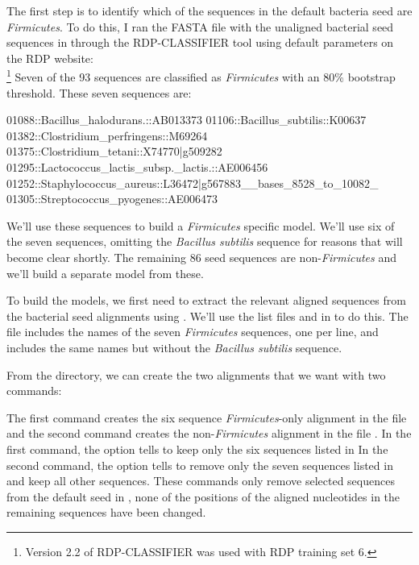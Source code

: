 The first step is to identify which of the sequences in the default
bacteria seed are \emph{Firmicutes}. To do this, I ran the FASTA file
with the unaligned bacterial seed sequences in
 through the RDP-CLASSIFIER tool
using default parameters \cite{Wang07} on the RDP website: \\
\footnote{Version
  2.2 of RDP-CLASSIFIER was used with RDP training set 6.}
Seven of the 93 sequences are classified as \emph{Firmicutes} with an
80\% bootstrap threshold. These seven sequences are:
\begin{sreoutput}
01088::Bacillus_halodurans.::AB013373
01106::Bacillus_subtilis::K00637
01382::Clostridium_perfringens::M69264
01375::Clostridium_tetani::X74770|g509282
01295::Lactococcus_lactis_subsp._lactis.::AE006456
01252::Staphylococcus_aureus::L36472|g567883__bases_8528_to_10082_
01305::Streptococcus_pyogenes::AE006473
\end{sreoutput}

We'll use these sequences to build a \emph{Firmicutes} specific model. 
We'll use six of the seven sequences, omitting the \emph{Bacillus subtilis}
sequence for reasons that will become clear shortly.
The remaining 86 seed sequences are non-\emph{Firmicutes} and we'll build 
a separate model from these. 

To build the models, we first need to extract the relevant aligned sequences
from the bacterial seed alignments using . We'll use
the list files  and  in
 to do this. The  file
includes the names of the seven \emph{Firmicutes} sequences, one per
line, and  includes the same names but without the
\emph{Bacillus subtilis} sequence. 

From the  directory, we can create the two alignments
that we want with two commands:



The first command creates the six sequence \emph{Firmicutes}-only
alignment in the file \\  and the
second command creates the non-\emph{Firmicutes}
alignment in the file . 
In the first command, the  option tells 
to keep only the six sequences listed in  In the
second command, the  option tells  to
remove only the seven sequences listed in  and keep
all other sequences.  These commands only remove selected sequences
from the default seed in , none of
the positions of the aligned nucleotides in the remaining sequences
have been changed.

